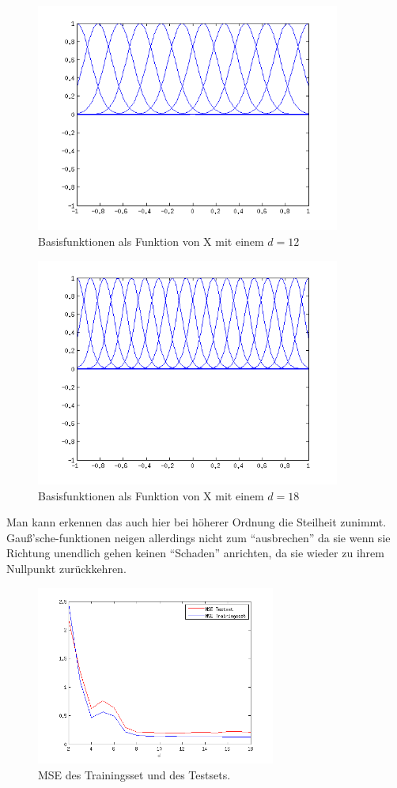 \begin{figure}[hp!]
\begin{center}
 \includegraphics[width=10cm]{./figures/RBF_12}
 \caption[Basisfunktionen als Funktion von X, d=12]{Basisfunktionen als Funktion von X mit einem $d=12$}
\label{fig:RBF_12}
\end{center}
\end{figure}


\begin{figure}[hp!]
\begin{center}
 \includegraphics[width=10cm]{./figures/RBF_18}
 \caption[Basisfunktionen als Funktion von X, d=18]{Basisfunktionen als Funktion von X mit einem $d=18$}
\label{fig:RBF_18}
\end{center}
\end{figure}
Man kann erkennen das auch hier bei höherer Ordnung die Steilheit zunimmt. Gau\ss{}'sche-funktionen neigen allerdings nicht zum ``ausbrechen''
da sie wenn sie Richtung unendlich gehen keinen ``Schaden'' anrichten, da sie wieder zu ihrem Nullpunkt zurückkehren.


\begin{figure}[hp!]
\begin{center}
 \includegraphics[width=0.7\textwidth]{./figures/RBF_MSE}
 \caption[MSE]{MSE des Trainingsset und des Testsets.}
\label{fig:RBF_MSE}
\end{center}
\end{figure}
\clearpage